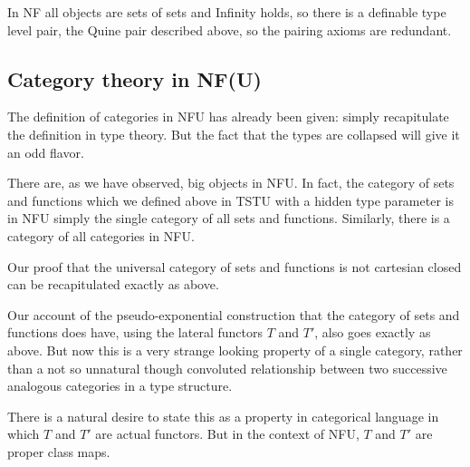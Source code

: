 \documentclass[12pt]{article}
\begin{document}
In NF all objects are sets of sets and Infinity holds, so there is a definable type level pair, the Quine pair described above, so the pairing axioms are redundant.

\subsection{Category theory in NF(U)}

The definition of categories in NFU has already been given:  simply recapitulate the definition in type theory.  But the fact that the types are collapsed will give it an odd flavor.

There are, as we have observed, big objects in NFU.  In fact, the category of sets and functions which we defined above in TSTU with a hidden type parameter is in NFU simply the single category of all sets and functions.  Similarly, there is a category of all categories in NFU.

Our proof that the universal category of sets and functions is not cartesian closed can be recapitulated exactly as above.

Our account of the pseudo-exponential construction that the category of sets and functions does have, using the lateral functors $T$ and $T'$, also goes exactly as above.  But now this is a very strange looking property of a single category, rather than a not so unnatural though convoluted relationship between two successive analogous categories in a type structure.

There is a natural desire to state this as a property in categorical language in which $T$ and $T'$ are actual functors.  But in the context of NFU, $T$ and $T'$ are proper class maps.
\end{document}
